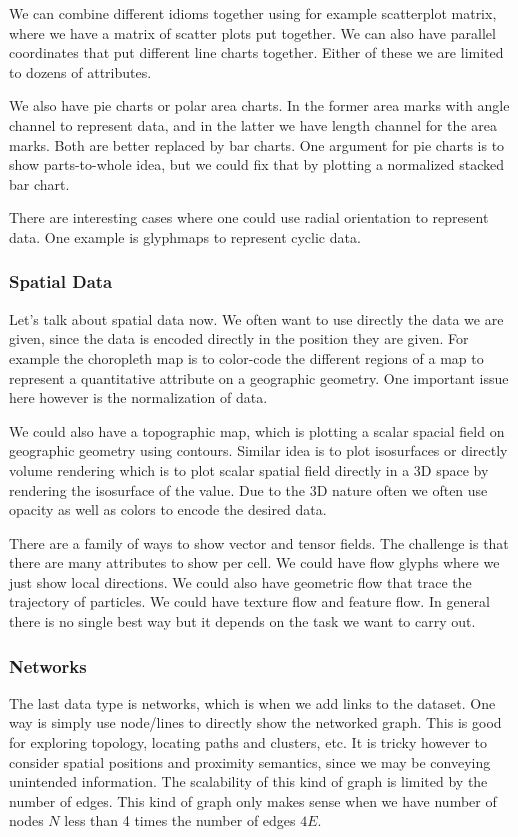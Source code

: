 \documentclass[letterpaper, 11pt]{article}
\numberwithin{equation}{section}
\numberwithin{figure}{section}
\begin{document}
We can combine different idioms together using for example scatterplot matrix,
where we have a matrix of scatter plots put together. We can also have parallel
coordinates that put different line charts together. Either of these we are
limited to dozens of attributes.

We also have pie charts or polar area charts. In the former area marks with
angle channel to represent data, and in the latter we have length channel for
the area marks. Both are better replaced by bar charts. One argument for pie
charts is to show parts-to-whole idea, but we could fix that by plotting a
normalized stacked bar chart.

There are interesting cases where one could use radial orientation to represent
data. One example is glyphmaps to represent cyclic data.

\subsubsection{Spatial Data}

Let's talk about spatial data now. We often want to use directly the data we are
given, since the data is encoded directly in the position they are given. For
example the choropleth map is to color-code the different regions of a map to
represent a quantitative attribute on a geographic geometry. One important issue
here however is the normalization of data.

We could also have a topographic map, which is plotting a scalar spacial field
on geographic geometry using contours. Similar idea is to plot isosurfaces or
directly volume rendering which is to plot scalar spatial field directly in a 3D
space by rendering the isosurface of the value. Due to the 3D nature often we
often use opacity as well as colors to encode the desired data.

There are a family of ways to show vector and tensor fields. The challenge is
that there are many attributes to show per cell. We could have flow glyphs where
we just show local directions. We could also have geometric flow that trace the
trajectory of particles. We could have texture flow and feature flow. In general
there is no single best way but it depends on the task we want to carry out.

\subsubsection{Networks}

The last data type is networks, which is when we add links to the dataset. One
way is simply use node/lines to directly show the networked graph. This is good
for exploring topology, locating paths and clusters, etc. It is tricky however
to consider spatial positions and proximity semantics, since we may be conveying
unintended information. The scalability of this kind of graph is limited by the
number of edges. This kind of graph only makes sense when we have number of
nodes $N$ less than 4 times the number of edges $4E$.
\end{document}
